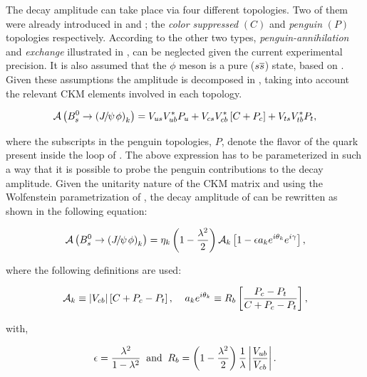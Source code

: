 The \BsJpsiPhi decay amplitude can take place via four different topologies.
Two of them were already introduced in  and ;
the {\it color suppressed }$(C)$ and {\it penguin} $(P)$ topologies respectively.
According to \cite{DeBruyn-thesis} the other two types, {\it penguin-annihilation}
and {\it exchange} illustrated in , can be neglected given the current experimental precision.
It is also assumed that the $\phi$ meson is a pure ($s\overline {s}$) state, based on \cite{Faller:2008gt}.
Given these assumptions the \BsJpsiPhi amplitude is decomposed in ,
taking into account the relevant CKM elements involved in each topology.

\begin{equation}
\mathcal{A} \left( B^0_s\rightarrow \left({J\mskip -3mu/\mskip -2mu\psi\mskip 2mu} \phi\right)_{k} \right) = V_{us}V_{ub}^*P_{u} + V_{cs}V_{cb}^*\left[ C +P_{c} \right] + V_{ts}V_{tb}^*P_{t},
 \label{bsjpsiphi_amp}
\end{equation}

\noindent where the subscripts in the penguin topologies, $P$, denote the flavor of the quark present inside the loop of .
The above expression has to be parameterized in such a way that it is possible to probe the penguin contributions to
the \BsJpsiPhi decay amplitude. Given the unitarity nature of the CKM matrix and using the Wolfenstein parametrization
of , the decay amplitude of  can be rewritten as shown in the following equation:

\begin{equation}
  \mathcal{A} \left( B^0_s\rightarrow \left({J\mskip -3mu/\mskip -2mu\psi\mskip 2mu} \phi\right)_{k} \right) = \eta_k  \left( 1-\frac{\lambda^2}{2} \right) \mathcal{A}_{k} \left[  1 - \epsilon a_k e^{i\theta_k} e^{i\gamma}  \right],
 \label{bsjpsiphi_amp_param}
\end{equation}

\noindent where the following definitions are used:

\begin{equation}
  \mathcal{A}_{k} \equiv |V_{cb}| \left[ C + P_c - P_t \right], \;\;\;\; a_k e^{i\theta_k} \equiv R_b \left[  \frac{P_c - P_t}{C + P_c - P_t}  \right],
  \label{bsjpsiphi_amp_param_defs}
\end{equation}

\noindent with,

\begin{equation}
  \epsilon = \frac{\lambda^2}{1-\lambda^2} \;\;\text{and} \;\;  R_b = \left( 1-\frac{\lambda^2}{2} \right) \frac{1}{\lambda} \left| \frac{V_{ub}}{V_{cb}} \right|.
  \label{bsjpsiphi_amp_param_defs_II}
\end{equation}

